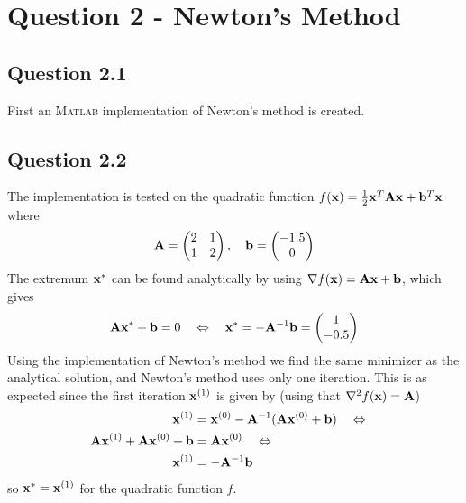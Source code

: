 \pagebreak

\section*{Question 2 - Newton's Method}
\subsection*{Question 2.1}
First an \textsc{Matlab} implementation of Newton's method is created.


\subsection*{Question 2.2}
The implementation is tested on the quadratic function $f(\mathbf{x}) = \frac{1}{2}\mathbf{x}^T\mathbf{Ax} + \mathbf{b}^T\mathbf{x}$ where
\begin{equation*}
    \mathbf{A} = \begin{pmatrix}
        2 & 1 \\
        1 & 2
    \end{pmatrix}, \quad \mathbf{b} = \begin{pmatrix}
        -1.5 \\
        0
    \end{pmatrix}
\end{equation*}
The extremum $\mathbf{x}^*$ can be found analytically by using $\nabla f(\mathbf{x}) = \mathbf{Ax} + \mathbf{b}$, which gives
\begin{align*}
    \mathbf{Ax}^* + \mathbf{b} = 0 \quad\Leftrightarrow\quad
    \mathbf{x}^* = -\mathbf{A}^{-1}\mathbf{b} = \begin{pmatrix}
        1 \\
        -0.5
    \end{pmatrix}
\end{align*}
Using the implementation of Newton's method we find the same minimizer as the analytical solution, and Newton's method uses only one iteration. This is as expected since the first iteration $\mathbf{x}^{(1)}$ is given by (using that $\nabla^2 f(\mathbf{x}) = \mathbf{A}$)
\begin{align*}
    \mathbf{x}^{(1)} &= \mathbf{x}^{(0)} - \mathbf{A}^{-1}(\mathbf{A}\mathbf{x}^{(0)}+\mathbf{b}) \quad\Leftrightarrow\quad\\
    \mathbf{A}\mathbf{x}^{(1)} + \mathbf{A}\mathbf{x}^{(0)} + \mathbf{b} &= \mathbf{A}\mathbf{x}^{(0)} \quad\Leftrightarrow\quad\\
    \mathbf{x}^{(1)} &= -\mathbf{A}^{-1}\mathbf{b}
\end{align*}
so $\mathbf{x}^*=\mathbf{x}^{(1)}$ for the quadratic function $f$.


